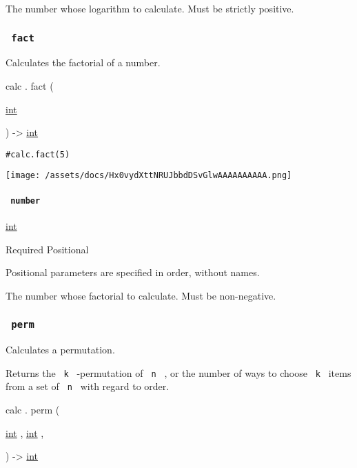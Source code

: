 The number whose logarithm to calculate. Must be strictly positive.

\subsubsection{\texorpdfstring{\texttt{\ fact\ }}{ fact }}\label{functions-fact}

Calculates the factorial of a number.

calc { . } { fact } (

{ \href{/docs/reference/foundations/int/}{int} }

) -\textgreater{} \href{/docs/reference/foundations/int/}{int}

\begin{verbatim}
#calc.fact(5)
\end{verbatim}

\texttt{[image: /assets/docs/Hx0vydXttNRUJbbdDSvGlwAAAAAAAAAA.png]}

\paragraph{\texorpdfstring{\texttt{\ number\ }}{ number }}\label{functions-fact-number}

\href{/docs/reference/foundations/int/}{int}

{Required} {{ Positional }}

\label{functions-fact-number-positional-tooltip}
Positional parameters are specified in order, without names.

The number whose factorial to calculate. Must be non-negative.

\subsubsection{\texorpdfstring{\texttt{\ perm\ }}{ perm }}\label{functions-perm}

Calculates a permutation.

Returns the \texttt{\ k\ } -permutation of \texttt{\ n\ } , or the
number of ways to choose \texttt{\ k\ } items from a set of
\texttt{\ n\ } with regard to order.

calc { . } { perm } (

{ \href{/docs/reference/foundations/int/}{int} , } {
\href{/docs/reference/foundations/int/}{int} , }

) -\textgreater{} \href{/docs/reference/foundations/int/}{int}

